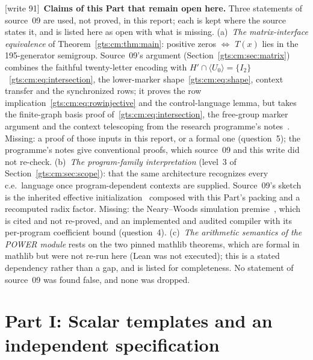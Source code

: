 \documentclass[11pt,letterpaper]{article}
\theoremstyle{definition}
\theoremstyle{remark}
\newcounter{cmsaveeq}
\newcommand{\wtagd}{\textup{[write 91]}}
\begin{document}
\wtagd\ \textbf{Claims of this Part that remain open here.} Three statements of source~09 are used, not proved, in this report; each is kept where the source states it, and is listed here as open with what is missing. (a)~\emph{The matrix-interface equivalence} of Theorem~\ref{gts:cm:thm:main}: positive zeros $\Leftrightarrow$ $T(x)$ lies in the 195-generator semigroup. Source~09's argument (Section~\ref{gts:cm:sec:matrix}) combines the faithful twenty-letter encoding with $H'\cap\langle U_0\rangle=\{I_2\}$~\eqref{gts:cm:eq:intersection}, the lower-marker shape~\eqref{gts:cm:eq:shape}, context transfer and the synchronized rows; it proves the row implication~\eqref{gts:cm:eq:rowinjective} and the control-language lemma, but takes the finite-graph basis proof of~\eqref{gts:cm:eq:intersection}, the free-group marker argument and the context telescoping from the research programme's notes~\cite{cm-gamma,cm-directed,cm-context,cm-synchronized}. Missing: a proof of those inputs in this report, or a formal one (question~5); the programme's notes give conventional proofs, which source~09 and this write did not re-check. (b)~\emph{The program-family interpretation} (level~3 of Section~\ref{gts:cm:sec:scope}): that the same architecture recognizes every c.e.\ language once program-dependent contexts are supplied. Source~09's sketch is the inherited effective initialization~\cite{cm-unary} composed with this Part's packing and a recomputed radix factor. Missing: the Neary--Woods simulation premise~\cite{cm-nearywoods}, which is cited and not re-proved, and an implemented and audited compiler with its per-program coefficient bound (question~4). (c)~\emph{The arithmetic semantics of the POWER module} rests on the two pinned mathlib theorems, which are formal in mathlib but were not re-run here (Lean was not executed); this is a stated dependency rather than a gap, and is listed for completeness. No statement of source~09 was found false, and none was dropped.

\setcounter{equation}{\value{cmsaveeq}}%
\let\theequation\cmoldtheequation\let\theHequation\cmoldtheHequation


\appendix
\section{Part I: Scalar templates and an independent specification}\label{gts:vk:app:scalar}
\end{document}

